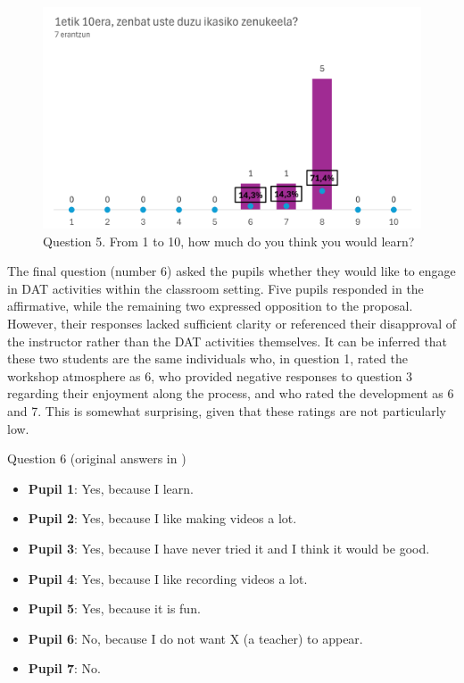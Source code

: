 \begin{figure}[!htbp]
    \centering
    \begin{minipage}{.75\textwidth}
    \includegraphics[width=\textwidth]{fig05.png}
    \caption{Question 5. From 1 to 10, how much do you think you
    would learn?}
    \label{fig-05}
    \end{minipage}
\end{figure}

The final question (number 6) asked the pupils whether they would
like to engage in DAT activities within the classroom setting. Five
pupils responded in the affirmative, while the remaining two expressed
opposition to the proposal. However, their responses lacked sufficient
clarity or referenced their disapproval of the instructor rather than
the DAT activities themselves. It can be inferred that these two
students are the same individuals who, in question 1, rated the workshop
atmosphere as 6, who provided negative responses to question 3 regarding
their enjoyment along the process, and who rated the development as 6
and 7. This is somewhat surprising, given that these ratings are not
particularly low.

Question 6 (original answers in )

\begin{itemize}
    \item \textbf{Pupil 1}: Yes, because I learn.
    \item \textbf{Pupil 2}: Yes, because I like making videos a lot.
    \item \textbf{Pupil 3}: Yes, because I have never tried it and I think it would be good.
    \item \textbf{Pupil 4}: Yes, because I like recording videos a lot.
    \item \textbf{Pupil 5}: Yes, because it is fun.
    \item \textbf{Pupil 6}: No, because I do not want X (a teacher) to appear.
    \item \textbf{Pupil 7}: No.
\end{itemize}
